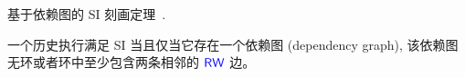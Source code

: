 
\begin{frame}{}
	\begin{center}
		基于依赖图的 SI 刻画定理~.

		\vspace{0.50cm}
		\begin{theorem}
			一个历史执行满足 \textup{SI} 当且仅当它存在一个依赖图 (dependency graph),
			该依赖图无环或者环中至少包含两条相邻的 $\textcolor{blue}{\textup{\textsf{RW}}}$ 边。
		\end{theorem}
	\end{center}
\end{frame}

\begin{frame}{}
  \begin{center}

		\vspace{0.20cm}
		{}
		\vspace{0.20cm}

  \end{center}
\end{frame}

\begin{frame}{}
	\begin{center}

		\vspace{0.20cm}
		{}
		\vspace{0.20cm}

	\end{center}
\end{frame}

